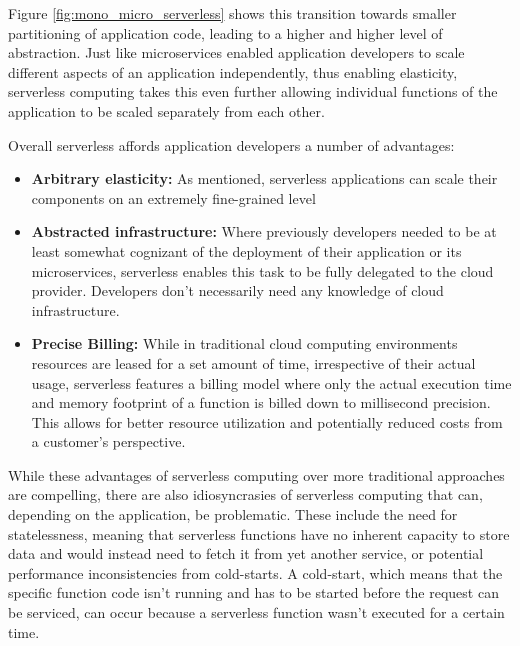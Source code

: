 Figure \ref{fig:mono_micro_serverless} shows this transition towards smaller partitioning of application code, leading to a higher and higher level of abstraction.
Just like microservices enabled application developers to scale different aspects of an application independently, thus enabling elasticity, serverless computing takes this even further allowing individual functions of the application to be scaled separately from each other\cite{jonasCloudProgrammingSimplified2019}.

Overall serverless affords application developers a number of advantages:
\begin{itemize}
    \item \textbf{Arbitrary elasticity:} As mentioned, serverless applications can scale their components on an extremely fine-grained level\cite{khandelwalTaureauDeconstructingServerless2020}
    \item \textbf{Abstracted infrastructure:} Where previously developers needed to be at least somewhat cognizant of the deployment of their application or its microservices, serverless enables this task to be fully delegated to the cloud provider. Developers don't necessarily need any knowledge of cloud infrastructure\cite{jonasCloudProgrammingSimplified2019}.
    \item \textbf{Precise Billing:} While in traditional cloud computing environments resources are leased for a set amount of time, irrespective of their actual usage\cite{khandelwalTaureauDeconstructingServerless2020}, serverless features a billing model where only the actual execution time and memory footprint of a function is billed down to millisecond precision\cite{jonasCloudProgrammingSimplified2019}. This allows for better resource utilization and potentially reduced costs from a customer's perspective\cite{khandelwalTaureauDeconstructingServerless2020}.
\end{itemize}

While these advantages of serverless computing over more traditional approaches are compelling, there are also idiosyncrasies of serverless computing that can, depending on the application, be problematic.
These include the need for statelessness, meaning that serverless functions have no inherent capacity to store data and would instead need to fetch it from yet another service\cite{khandelwalTaureauDeconstructingServerless2020}, or potential performance inconsistencies from cold-starts.
A cold-start, which means that the specific function code isn't running and has to be started before the request can be serviced, can occur because a serverless function wasn't executed for a certain time\cite{wangPeekingCurtainsServerless2018}.

